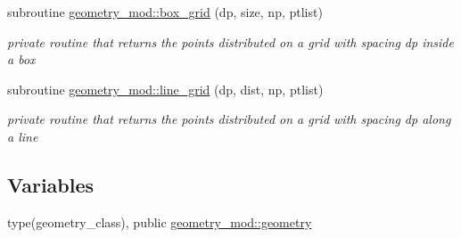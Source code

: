 \begin{DoxyCompactItemize}
subroutine \mbox{\hyperlink{namespacegeometry__mod_ae87e4ecff2d21a839da2b82919b5fd0b}{geometry\+\_\+mod\+::box\+\_\+grid}} (dp, size, np, ptlist)
\begin{DoxyCompactList}\small\item\em private routine that returns the points distributed on a grid with spacing dp inside a box ~\newline
 \end{DoxyCompactList}\item 
subroutine \mbox{\hyperlink{namespacegeometry__mod_abcb09c0f5274c27cb79b0dd009ed94b3}{geometry\+\_\+mod\+::line\+\_\+grid}} (dp, dist, np, ptlist)
\begin{DoxyCompactList}\small\item\em private routine that returns the points distributed on a grid with spacing dp along a line ~\newline
 \end{DoxyCompactList}\end{DoxyCompactItemize}
\subsection*{Variables}
\begin{DoxyCompactItemize}
\item 
type(geometry\+\_\+class), public \mbox{\hyperlink{namespacegeometry__mod_ad2ad4f7e1138beaad5f37d5c15b7b457}{geometry\+\_\+mod\+::geometry}}
\end{DoxyCompactItemize}
